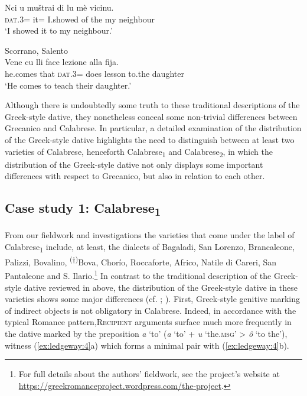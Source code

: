 \documentclass[output=paper,modfonts,nonflat,colorlinks,citecolor=brown]{langsci/langscibook}
\begin{document}
\ex
	\gll Nci  u  muštrai  di  lu  mè  vicinu.\\
    \textsc{dat}.3=  it=  I.showed  of  the  my  neighbour\\
    \glt `I showed it to my neighbour.'
\z
\z

\ea\label{ex:ledgeway:3}
Scorrano, Salento\\
\gll Vene  cu  lli  face  lezione  alla  fija.\\
he.comes  that  \textsc{dat}.3=  does  lesson  to.the  daughter\\
\glt `He comes to teach their daughter.'
\z

Although there is undoubtedly some truth to these traditional descriptions of the Greek-style dative, they nonetheless conceal some non-trivial differences between Grecanico and Calabrese. In particular, a detailed examination of the distribution of the Greek-style dative highlights the need to distinguish between at least two varieties of Calabrese, henceforth Calabrese\textsubscript{1} and Calabrese\textsubscript{2}, in which the distribution of the Greek-style dative not only displays some important differences with respect to Grecanico, but also in relation to each other.

\subsection{Case study 1: Calabrese\textsubscript{1}}

From our fieldwork and investigations the varieties that come under the label of Calabrese\textsubscript{1} include, at least, the dialects of Bagaladi, San Lorenzo, Brancaleone, Palizzi, Bovalino, \textsuperscript{(†)}Bova, Chorío, Roccaforte, Africo, Natile di Careri, San Pantaleone and S. Ilario.\footnote{For full details about the authors’ fieldwork, see the project’s website at \url{https://greekromanceproject.wordpress.com/the-project}.} In contrast to the traditional description of the Greek-style dative reviewed in  above, the distribution of the Greek-style dative in these varieties shows some major differences (cf. \citealt{Trumper2003}; \citealt[193-196]{Ledgeway2013}). First, Greek-style genitive marking of indirect objects is not obligatory in Calabrese. Indeed, in accordance with the typical Romance pattern,\textsc{Recipient} arguments surface much more frequently in the dative marked by the preposition \textit{a} ‘to’ (\textit{a} ‘to’ + \textit{u} ‘the.\textsc{msg}’ > \textit{ô} ‘to the’), witness (\ref{ex:ledgeway:4}a) which forms a minimal pair with (\ref{ex:ledgeway:4}b).
\end{document}
